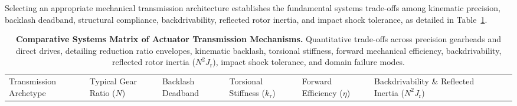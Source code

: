 \documentclass[
  letterpaper,
  DIV=11,
  numbers=noendperiod]{scrartcl}
\begin{document}
Selecting an appropriate mechanical transmission architecture
establishes the fundamental systems trade-offs among kinematic
precision, backlash deadband, structural compliance, backdrivability,
reflected rotor inertia, and impact shock tolerance, as detailed in
Table~\ref{tbl-02-mechanical-drives}.

\begin{longtable}[]{@{}
  >{\raggedright\arraybackslash}p{}
  >{\raggedright\arraybackslash}p{}
  >{\raggedright\arraybackslash}p{}
  >{\raggedright\arraybackslash}p{}
  >{\raggedright\arraybackslash}p{}
  >{\raggedright\arraybackslash}p{}
  >{\raggedright\arraybackslash}p{}
  >{\raggedright\arraybackslash}p{}@{}}
\caption{\textbf{Comparative Systems Matrix of Actuator Transmission
Mechanisms.} Quantitative trade-offs across precision gearheads and
direct drives, detailing reduction ratio envelopes, kinematic backlash,
torsional stiffness, forward mechanical efficiency, backdrivability,
reflected rotor inertia (\(N^2 J_{\text{r}}\)), impact shock tolerance,
and domain failure
modes.}\label{tbl-02-mechanical-drives}\tabularnewline
\toprule\noalign{}
\begin{minipage}[b]{\linewidth}\raggedright
Transmission Archetype
\end{minipage} & \begin{minipage}[b]{\linewidth}\raggedright
Typical Gear Ratio (\(N\))
\end{minipage} & \begin{minipage}[b]{\linewidth}\raggedright
Backlash Deadband
\end{minipage} & \begin{minipage}[b]{\linewidth}\raggedright
Torsional Stiffness (\(k_{\tau}\))
\end{minipage} & \begin{minipage}[b]{\linewidth}\raggedright
Forward Efficiency (\(\eta\))
\end{minipage} & \begin{minipage}[b]{\linewidth}\raggedright
Backdrivability \& Reflected Inertia (\(N^2 J_{\text{r}}\))
\end{minipage} & \begin{minipage}[b]{\linewidth}\raggedright

\end{minipage}
\end{longtable}
\end{document}
